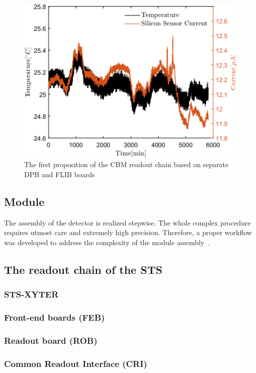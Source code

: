 \begin{figure}[!h]
\centering
\includegraphics[width=0.65\columnwidth]{Chapter2/images/currenttempnobeam.png}
\caption{The first proposition of the CBM readout chain based on separate DPB and FLIB boards \cite{CRI}}
\label{fig_leakage1}
\end{figure}



\subsection{Module}
\label{module}
 The assembly of the detector is realized stepwise. The whole complex procedure requires utmost care and extremely high precision. Therefore, a proper workflow was developed to address the complexity of the module assembly~\cite{carmen2}.

\subsection{The readout chain of the STS}
\label{readout}
\label{DAQ}
\subsubsection{STS-XYTER}

\subsubsection{Front-end boards (FEB)}

\subsubsection{Readout board (ROB)}

\subsubsection{Common Readout Interface (CRI)}
